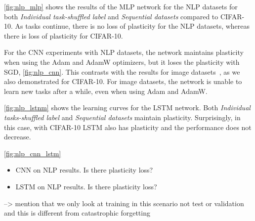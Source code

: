 \autoref{fig:nlp_mlp} shows the results of the MLP network for the NLP datasets for both \textit{Individual task-shuffled label} and \textit{Sequential datasets} compared to CIFAR-10. As tasks continue, there is no loss of plasticity for the NLP datasets, whereas there is loss of plasticity for CIFAR-10.


For the CNN experiments with NLP datasets, the network maintains plasticity when using the Adam and AdamW optimizers, but it loses the plasticity with SGD, \autoref{fig:nlp_cnn}. This contrasts with the results for image datasets~\cite{plasticity papers}, as we also demonstrated for CIFAR-10. For image datasets, the network is unable to learn new tasks after a while, even when using Adam and AdamW.

\autoref{fig:nlp_lstnm} shows the learning curves for the LSTM network. Both \textit{Individual tasks-shuffled label} and \textit{Sequential datasets} maintain plasticity. Surprisingly, in this case, with CIFAR-10 LSTM also has plasticity and the performance does not decrease.




\autoref{fig:nlp_cnn_lstm}
\begin{itemize}
    \item CNN on NLP results. Is there plasticity loss?
    \item LSTM on NLP results. Is there plasticity loss?
\end{itemize}



--> mention that we only look at training in this scenario not test or validation and this is different from catastrophic forgetting

